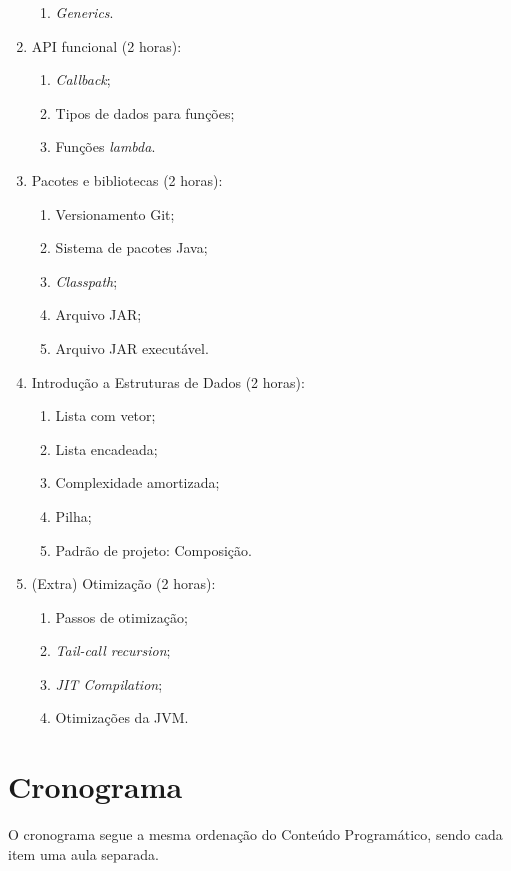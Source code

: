 \documentclass{article}
\begin{document}
\begin{enumerate}
\begin{samepage}
\begin{enumerate}
                \item \textit{Generics}.
        \end{enumerate}
        \end{samepage}
    \item API funcional (2 horas):
        \begin{samepage}
        \begin{enumerate}
                \item \textit{Callback};
                \item Tipos de dados para funções;
                \item Funções \textit{lambda}.
        \end{enumerate}
        \end{samepage}
    \item Pacotes e bibliotecas (2 horas):
        \begin{samepage}
        \begin{enumerate}
                \item Versionamento Git;
                \item Sistema de pacotes Java;
                \item \textit{Classpath};
                \item Arquivo JAR\@;
                \item Arquivo JAR executável.
        \end{enumerate}
        \end{samepage}
    \item Introdução a Estruturas de Dados (2 horas):
        \begin{samepage}
        \begin{enumerate}
                \item Lista com vetor;
                \item Lista encadeada;
                \item Complexidade amortizada;
                \item Pilha;
                \item Padrão de projeto: Composição.
        \end{enumerate}
        \end{samepage}
    \item (Extra) Otimização (2 horas):
        \begin{samepage}
        \begin{enumerate}
                \item Passos de otimização;
                \item \textit{Tail-call recursion};
                \item \textit{JIT Compilation};
                \item Otimizações da JVM\@.
        \end{enumerate}
        \end{samepage}
\end{enumerate}

\section{Cronograma}

O cronograma segue a mesma ordenação do Conteúdo Programático, sendo cada item
uma aula separada.

\nocite{*}


\end{document}
